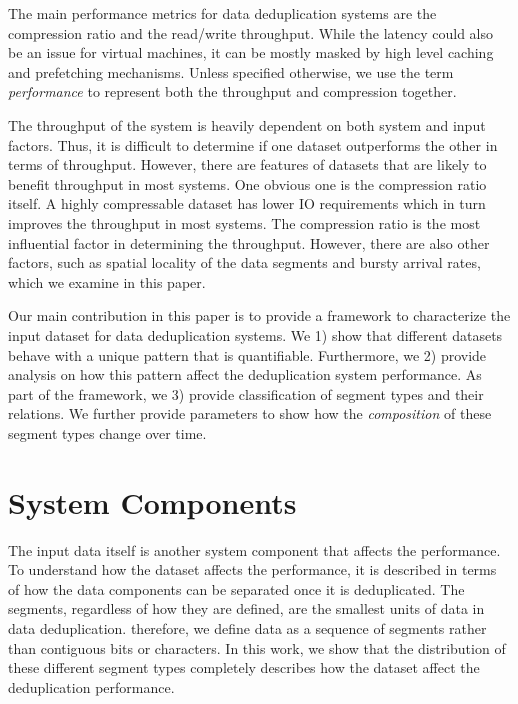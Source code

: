 The main performance metrics for data deduplication systems are the compression ratio and the read/write throughput. While the latency could also be an issue for virtual machines, it can be mostly masked by high level caching and prefetching mechanisms. Unless specified otherwise, we use the term \emph{performance} to represent both the throughput and compression together. 

The throughput of the system is heavily dependent on both system and input factors. Thus, it is difficult to determine if one dataset outperforms the other in terms of throughput. However, there are features of datasets that are likely to benefit throughput in most systems. One obvious one is the compression ratio itself. A highly compressable dataset has lower IO requirements which in turn improves the throughput in most systems. The compression ratio is the most influential factor in determining the throughput. However, there are also other factors, such as spatial locality of the data segments and bursty arrival rates, which we examine in this paper. 

Our main contribution in this paper is to provide a framework to characterize the input dataset for data deduplication systems. We 1) show that different datasets behave with a unique pattern that is quantifiable. Furthermore, we 2) provide analysis on how this pattern affect the deduplication system performance. As part of the framework, we 3) provide classification of segment types and their relations. We further provide parameters to show how the \emph{composition} of these segment types change over time. 

\section{System Components}\label{sys}

The input data itself is another system component that affects the performance. To understand how the dataset affects the performance, it is described in terms of how the data components can be separated once it is deduplicated. The segments, regardless of how they are defined, are the smallest units of data in data deduplication. therefore, we define data as a sequence of segments rather than contiguous bits or characters. In this work, we show that the distribution of these different segment types completely describes how the dataset affect the deduplication performance.

